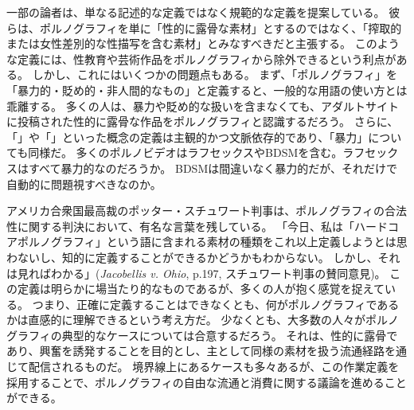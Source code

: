\documentclass[paper=a4,book,openany]{jlreq}
\begin{document}
一部の論者は、単なる記述的な定義ではなく規範的な定義を提案している。
彼らは、ポルノグラフィを単に「性的に露骨な素材」とするのではなく、「搾取的または女性差別的な性描写を含む素材」とみなすべきだと主張する。
このような定義には、性教育や芸術作品をポルノグラフィから除外できるという利点がある。
しかし、これにはいくつかの問題点もある。
まず、「ポルノグラフィ」を「暴力的・貶め的・非人間的なもの」と定義すると、一般的な用語の使い方とは乖離する。
多くの人は、暴力や貶め的な扱いを含まなくても、アダルトサイトに投稿された性的に露骨な作品をポルノグラフィと認識するだろう。
さらに、「」や「」といった概念の定義は主観的かつ文脈依存的であり、「暴力」についても同様だ。
多くのポルノビデオはラフセックスやBDSMを含む。ラフセックスはすべて暴力的なのだろうか。
BDSMは間違いなく暴力的だが、それだけで自動的に問題視すべきなのか。

アメリカ合衆国最高裁のポッター・スチュワート判事は、ポルノグラフィの合法性に関する判決において、有名な言葉を残している。
「今日、私は「ハードコアポルノグラフィ」という語に含まれる素材の種類をこれ以上定義しようとは思わないし、知的に定義することができるかどうかもわからない。
しかし、それは見ればわかる」(\emph{Jacobellis v. Ohio}, p.197, スチュワート判事の賛同意見)。
この定義は明らかに場当たり的なものであるが、多くの人が抱く感覚を捉えている。
つまり、正確に定義することはできなくとも、何がポルノグラフィであるかは直感的に理解できるという考え方だ。
少なくとも、大多数の人々がポルノグラフィの典型的なケースについては合意するだろう。
それは、性的に露骨であり、興奮を誘発することを目的とし、主として同様の素材を扱う流通経路を通じて配信されるものだ。
境界線上にあるケースも多々あるが、この作業定義を採用することで、ポルノグラフィの自由な流通と消費に関する議論を進めることができる。
\end{document}
